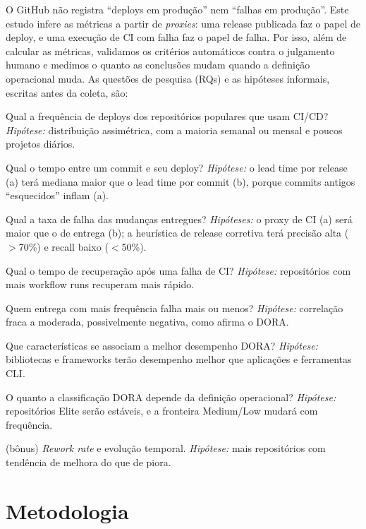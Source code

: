 \documentclass[12pt]{article}
\begin{document}
O GitHub não registra ``deploys em produção'' nem ``falhas em produção''.
Este estudo infere as métricas a partir de \emph{proxies}: uma release
publicada faz o papel de deploy, e uma execução de CI com falha faz o papel de
falha. Por isso, além de calcular as métricas, validamos os critérios
automáticos contra o julgamento humano e medimos o quanto as conclusões mudam
quando a definição operacional muda. As questões de pesquisa (RQs) e as
hipóteses informais, escritas antes da coleta, são:

\begin{description}[leftmargin=0pt,font=\normalfont\bfseries]
  \item[RQ01] Qual a frequência de deploys dos repositórios populares que usam
    CI/CD? \emph{Hipótese:} distribuição assimétrica, com a maioria semanal ou
    mensal e poucos projetos diários.
  \item[RQ02] Qual o tempo entre um commit e seu deploy? \emph{Hipótese:} o
    lead time por release (a) terá mediana maior que o lead time por commit
    (b), porque commits antigos ``esquecidos'' inflam (a).
  \item[RQ03] Qual a taxa de falha das mudanças entregues? \emph{Hipóteses:}
    o proxy de CI (a) será maior que o de entrega (b); a heurística de release
    corretiva terá precisão alta ($>$70\%) e recall baixo ($<$50\%).
  \item[RQ04] Qual o tempo de recuperação após uma falha de CI?
    \emph{Hipótese:} repositórios com mais workflow runs recuperam mais rápido.
  \item[RQ05] Quem entrega com mais frequência falha mais ou menos?
    \emph{Hipótese:} correlação fraca a moderada, possivelmente negativa, como
    afirma o DORA.
  \item[RQ06] Que características se associam a melhor desempenho DORA?
    \emph{Hipótese:} bibliotecas e frameworks terão desempenho melhor que
    aplicações e ferramentas CLI.
  \item[RQ07] O quanto a classificação DORA depende da definição operacional?
    \emph{Hipótese:} repositórios Elite serão estáveis, e a fronteira
    Medium/Low mudará com frequência.
  \item[RQ08] (bônus) \emph{Rework rate} e evolução temporal. \emph{Hipótese:}
    mais repositórios com tendência de melhora do que de piora.
\end{description}

\section{Metodologia}
\end{document}
